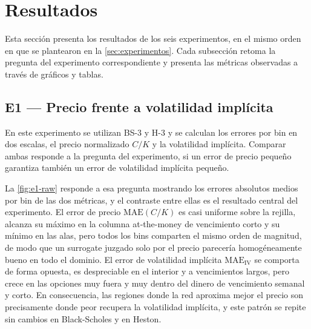 \documentclass[11pt,a4paper]{article}
\begin{document}
\newpage

\section{Resultados}\label{sec:resultados}

Esta sección presenta los resultados de los seis experimentos, en el mismo orden en que se plantearon en la \autoref{sec:experimentos}. Cada subsección retoma la pregunta del experimento correspondiente y presenta las métricas observadas a través de gráficos y tablas.

\subsection{E1 --- Precio frente a volatilidad implícita}\label{sec:res-e1}

En este experimento se utilizan BS-3 y H-3 y se calculan los errores por bin en dos escalas, el precio normalizado $C/K$ y la volatilidad implícita. Comparar ambas responde a la pregunta del experimento, si un error de precio pequeño garantiza también un error de volatilidad implícita pequeño.

La \autoref{fig:e1-raw} responde a esa pregunta mostrando los errores absolutos medios por bin de las dos métricas, y el contraste entre ellas es el resultado central del experimento. El error de precio $\text{MAE}(C/K)$ es casi uniforme sobre la rejilla, alcanza su máximo en la columna at-the-money de vencimiento corto y su mínimo en las alas, pero todos los bins comparten el mismo orden de magnitud, de modo que un surrogate juzgado solo por el precio parecería homogéneamente bueno en todo el dominio. El error de volatilidad implícita $\text{MAE}_{\text{IV}}$ se comporta de forma opuesta, es despreciable en el interior y a vencimientos largos, pero crece en las opciones muy fuera y muy dentro del dinero de vencimiento semanal y corto. En consecuencia, las regiones donde la red aproxima mejor el precio son precisamente donde peor recupera la volatilidad implícita, y este patrón se repite sin cambios en Black-Scholes y en Heston.
\end{document}
